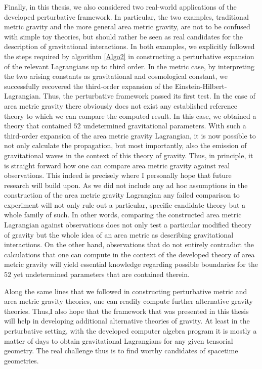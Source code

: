 Finally, in this thesis, we also considered two real-world applications of the developed perturbative framework. In particular, the two examples, traditional metric gravity and the more general area metric gravity, are not to be confused with simple toy theories, but should rather be seen as real candidates for the description of gravitational interactions. In both examples, we explicitly followed the steps required by algorithm \ref{Algo2} in constructing a perturbative expansion of the relevant Lagrangians up to third order. In the metric case, by interpreting the two arising constants as gravitational and cosmological constant, we successfully recovered the third-order expansion of the Einstein-Hilbert-Lagrangian.
Thus, the perturbative framework passed its first test.
In the case of area metric gravity there obviously does not exist any established reference theory to which we can compare the computed result. In this case, we obtained a theory that contained $52$ undetermined gravitational parameters. 
With such a third-order expansion of the area metric gravity Lagrangian, it is now possible to not only calculate the propagation, but most importantly, also the emission of gravitational waves in the context of this theory of gravity. Thus, in principle, it is straight forward how one can compare area metric gravity against real observations. This indeed is precisely where I personally hope that future research will build upon. 
As we did not include any ad hoc assumptions in the construction of the area metric gravity Lagrangian any failed comparison to experiment will not only rule out a particular, specific candidate theory but a whole family of such. In other words, comparing the constructed area metric Lagrangian against observations does not only test a particular modified theory of gravity but the whole idea of an area metric as describing gravitational interactions. 
On the other hand, observations that do not entirely contradict the calculations that one can compute in the context of the developed theory of area metric gravity will yield essential knowledge regarding possible boundaries for the $52$ yet undetermined parameters that are contained therein. 

Along the same lines that we followed in constructing perturbative metric and area metric gravity theories, one can readily compute further alternative gravity theories.
Thus,I also hope that the framework that was presented in this thesis will help in developing additional alternative theories of gravity. At least in the perturbative setting, with the developed computer algebra program it is mostly a matter of days to obtain gravitational Lagrangians for any given tensorial geometry. The real challenge thus is to find worthy candidates of spacetime geometries. 

